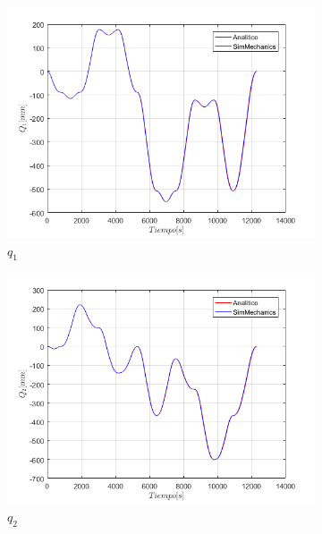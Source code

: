 \begin{figure}
    \centering
    \begin{subfigure}{0.45\textwidth}
        \includegraphics[width=\linewidth]{Cap4_DisenoBasico/Figura/ComparativoSimMechanics/Q1.png}
        \caption{$q_1$}
    \end{subfigure}
    \begin{subfigure}{0.45\textwidth}
        \includegraphics[width=\linewidth]{Cap4_DisenoBasico/Figura/ComparativoSimMechanics/Q2.png}
        \caption{$q_2$}
    \end{subfigure}
    \begin{subfigure}{0.45\textwidth}

\end{subfigure}
\end{figure}
